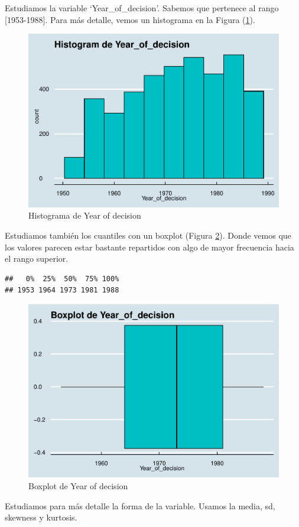 \documentclass[
]{article}
\begin{document}
Estudiamos la variable `Year\_of\_decision'. Sabemos que pertenece al
rango {[}1953-1988{]}. Para más detalle, vemos un histograma en la
Figura (\ref{fig:hist_year}).

\begin{figure}

{\centering \includegraphics[width=0.5\linewidth]{anacalt-regresion_files/figure-latex/hist_year-1} 

}

\caption{Histograma de Year of decision}\label{fig:hist_year}
\end{figure}

Estudiamos también los cuantiles con un boxplot (Figura
\ref{fig:box_year}). Donde vemos que los valores parecen estar bastante
repartidos con algo de mayor frecuencia hacia el rango superior.

\begin{verbatim}
##   0%  25%  50%  75% 100% 
## 1953 1964 1973 1981 1988
\end{verbatim}

\begin{figure}

{\centering \includegraphics[width=0.5\linewidth]{anacalt-regresion_files/figure-latex/box_year-1} 

}

\caption{Boxplot de Year of decision}\label{fig:box_year}
\end{figure}

Estudiamos para más detalle la forma de la variable. Usamos la media,
sd, skewness y kurtosis.
\end{document}
